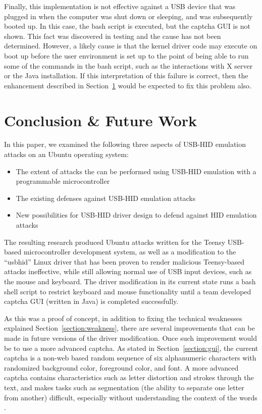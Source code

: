 \documentclass[pagenumbers]{ieee}
\begin{document}
Finally, this implementation is not effective against a USB device that was plugged in when the computer was shut down or sleeping, and was subsequently booted up.  In this case, the bash script is executed, but the captcha GUI is not shown. This fact was discovered in testing and the cause has not been determined. However, a likely cause is that the kernel driver code may execute on boot up before the user environment is set up to the point of being able to run some of the commands in the bash script, such as the interactions with X server or the Java installation. If this interpretation of this failure is correct, then the enhancement described in Section~\ref{section:conclusion} would be expected to fix this problem also.


\section{Conclusion \& Future Work}
\label{section:conclusion}

In this paper, we examined the following three aspects of USB-HID emulation attacks on an Ubuntu operating system:

\begin{itemize}
\item The extent of attacks the can be performed using USB-HID emulation with a programmable microcontroller
\item The existing defenses against USB-HID emulation attacks
\item New possibilities for USB-HID driver design to defend against HID emulation attacks
\end{itemize}

The resulting research produced Ubuntu attacks written for the Teensy USB-based microcontroller development system, as well as a modification to the ``usbhid'' Linux driver that has been proven to render malicious Teensy-based attacks ineffective, while still allowing normal use of USB input devices, such as the mouse and keyboard. The driver modification in its current state runs a bash shell script to restrict keyboard and mouse functionality until a team developed captcha GUI (written in Java) is completed successfully.

As this was a proof of concept, in addition to fixing the technical weaknesses explained Section~\ref{section:weakness}, there are several improvements that can be made in future versions of the driver modification. Once such improvement would be to use a more advanced captcha. As stated in Section~\ref{section:gui}, the current captcha is a non-web based random sequence of six alphanumeric characters with randomized background color, foreground color, and font. A more advanced captcha contains characteristics such as letter distortion and strokes through the text, and makes tasks such as segmentation (the ability to separate one letter from another) difficult, especially without understanding the context of the words \cite{captcha}.
\end{document}
